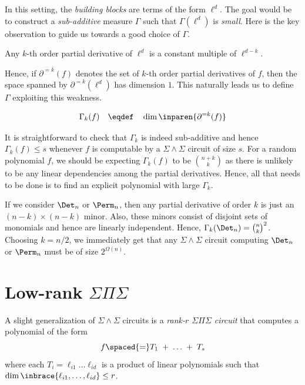 In this setting, the \emph{building blocks} are terms of the form $\ell^d$. 
The goal would be to construct a \emph{sub-additive} measure $\Gamma$ such that $\Gamma(\ell^d)$ is \emph{small}. 
Here is the key observation to guide us towards a good choice of $\Gamma$. 

\begin{observation}\label{obs:low-rank-sps-rank}
Any $k$-th order partial derivative of $\ell^d$ is a constant multiple of $\ell^{d-k}$. 
\end{observation}

Hence, if $\partial^{=k}(f)$ denotes the set of $k$-th order partial derivatives of $f$, then the space spanned by $\partial^{=k}(\ell^d)$ has dimension $1$. 
This naturally leads us to define $\Gamma$ exploiting this weakness. 

$$
\Gamma_k(f)\quad \eqdef \quad \dim \inparen{\partial^{=k}(f)}
$$

It is straightforward to check that $\Gamma_k$ is indeed sub-additive and hence $\Gamma_k(f) \leq s$ whenever $f$ is computable by a $\Sigma\!\wedge\!\Sigma$ circuit of size $s$. 
For a random polynomial $f$, we should be expecting $\Gamma_k(f)$ to be $\binom{n+k}{k}$ as there is unlikely to be any linear dependencies among the partial derivatives. 
Hence, all that needs to be done is to find an explicit polynomial with large $\Gamma_k$. 


If we consider $\Det_n$ or $\Perm_n$, then any partial derivative of order $k$ is just an $(n-k)\times(n-k)$ minor. 
Also, these minors consist of disjoint sets of monomials and hence are linearly independent. 
Hence, $\Gamma_k(\Det_n) = \binom{n}{k}^2$. 
Choosing $k = n/2$, we immediately get that any $\Sigma\!\wedge\!\Sigma$ circuit computing $\Det_n$ or $\Perm_n$ must be of size $2^{\Omega(n)}$. \\

\section{Low-rank $\Sigma\Pi\Sigma$}\label{sec:low-rank-sps}

A slight generalization of $\Sigma\!\wedge\!\Sigma$ circuits is a \emph{rank-$r$ $\Sigma\Pi\Sigma$ circuit} that computes a polynomial of the form 
$$
f \spaced{=}  T_1 \;+\; \dots \;+\; T_s
$$
where each $T_i = \ell_{i1}\dots \ell_{id}$ is a product of linear polynomials such that $\dim\inbrace{\ell_{i1},\dots, \ell_{id}}\leq r$. \\

